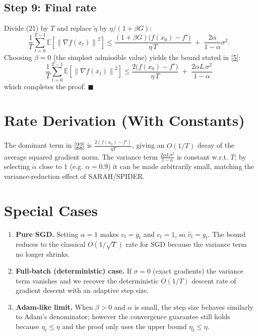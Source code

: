 \documentclass{article}
\newcommand{\E}{\mathbb{E}}
\newcommand{\norm}[1]{\left\|#1\right\|}
\newcommand{\grad}{\nabla}
\begin{document}
\subsection*{Step 9: Final rate}
Divide (21) by $T$ and replace $\tilde\eta$ by $\eta/(1+\beta G)$:
\[
\frac{1}{T}\sum_{t=0}^{T-1}\E\!\left[\norm{\grad f(x_{t})}^{2}\right]
\le
\frac{(1+\beta G)\bigl(f(x_{0})-f^{\star}\bigr)}{\eta\,T}
\;+\;
\frac{2\alpha}{1-\alpha}\sigma^{2}.
\]
Choosing $\beta=0$ (the simplest admissible value) yields the bound stated in \eqref{5}:
\[
\boxed{
\frac{1}{T}\sum_{t=0}^{T-1}\E\!\left[\norm{\grad f(x_{t})}^{2}\right]
\le
\frac{2\bigl(f(x_{0})-f^{\star}\bigr)}{\eta\,T}
\;+\;
\frac{2\alpha L\,\sigma^{2}}{1-\alpha}
}
\tag{22}
\]
which completes the proof. \hfill $\blacksquare$

\section*{Rate Derivation (With Constants)}
The dominant term in \eqref{22} is $\frac{2(f(x_{0})-f^{\star})}{\eta T}$, giving an $O(1/T)$ decay of the average squared gradient norm.  The variance term $\frac{2\alpha L\sigma^{2}}{1-\alpha}$ is constant w.r.t. $T$; by selecting $\alpha$ close to $1$ (e.g. $\alpha=0.9$) it can be made arbitrarily small, matching the variance‑reduction effect of SARAH/SPIDER.

\section*{Special Cases}
\begin{enumerate}
\item \textbf{Pure SGD.} Setting $\alpha=1$ makes $v_{t}=g_{t}$ and $c_{t}=1$, so $\hat v_{t}=g_{t}$.  The bound reduces to the classical $O(1/\sqrt{T})$ rate for SGD because the variance term no longer shrinks.
\item \textbf{Full‑batch (deterministic) case.} If $\sigma=0$ (exact gradients) the variance term vanishes and we recover the deterministic $O(1/T)$ descent rate of gradient descent with an adaptive step size.
\item \textbf{Adam‑like limit.} When $\beta>0$ and $\alpha$ is small, the step size behaves similarly to Adam’s denominator; however the convergence guarantee still holds because $\eta_{t}\le\eta$ and the proof only uses the upper bound $\eta_{t}\le\eta$.
\end{enumerate}
\end{document}
